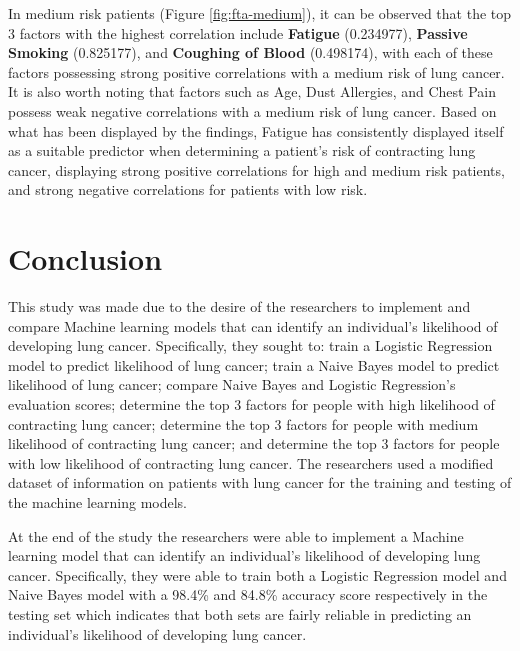 \documentclass[runningheads]{llncs}
\begin{document}
In medium risk patients (Figure \ref{fig:fta-medium}), it can be observed that the top 3 factors with the highest correlation include \textbf{Fatigue} (0.234977), \textbf{Passive Smoking} (0.825177), and \textbf{Coughing of Blood} (0.498174), with each of these factors possessing strong positive correlations with a medium risk of lung cancer. It is also worth noting that factors such as Age, Dust Allergies, and Chest Pain possess weak negative correlations with a medium risk of lung cancer.
Based on what has been displayed by the findings, Fatigue has consistently displayed itself as a suitable predictor when determining a patient's risk of contracting lung cancer, displaying strong positive correlations for high and medium risk patients, and strong negative correlations for patients with low risk.

\section{Conclusion}

This study was made due to the desire of the researchers to implement and compare Machine learning models that can identify an individual’s likelihood of developing lung cancer. Specifically, they sought to: train a Logistic Regression model to predict likelihood of lung cancer; train a Naive Bayes model to predict likelihood of lung cancer; compare Naive Bayes and Logistic Regression’s evaluation scores; determine the top 3 factors for people with high likelihood of contracting lung cancer; determine the top 3 factors for people with medium likelihood of contracting lung cancer; and determine the top 3 factors for people with low likelihood of contracting lung cancer. The researchers used a modified dataset of information on patients with lung cancer for the training and testing of the machine learning models. 

At the end of the study the researchers were able to implement a Machine learning model that can identify an individual’s likelihood of developing lung cancer. Specifically, they were able to train both a Logistic Regression model and Naive Bayes model with a 98.4\% and 84.8\% accuracy score respectively in the testing set which indicates that both sets are fairly reliable in predicting an individual’s likelihood of developing lung cancer. 
	
\end{document}

